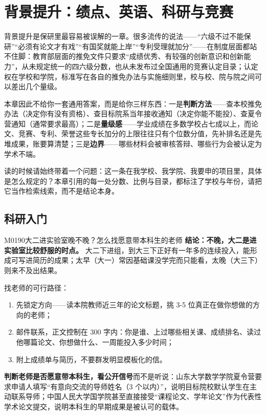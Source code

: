 \chapter{背景提升：绩点、英语、科研与竞赛}
\label{ch04}
\begin{keybox}
背景提升是保研里最容易被误解的一章。很多流传的说法——“六级不过不能保研”“必须有论文才有戏”“有国奖就能上岸”“专利受理就加分”——在制度层面都站不住脚：教育部层面的推免文件只要求“成绩优秀、有较强的创新意识和创新能力”，从未规定统一的四六级分数，也从未发布过全国通用的竞赛认定目录；认定权在学校和学院，标准写在各自的推免办法与实施细则里，校与校、院与院之间可以差出几个量级。

本章因此不给你一套通用答案，而是给你三样东西：一是\textbf{判断方法}——查本校推免办法（决定你有没有资格）、查目标院系当年接收通知（决定你能不能投）、查夏令营通知（通常要求最高）；二是\textbf{量级感}——学业成绩在多数学校占七成以上，而论文、竞赛、专利、荣誉这些专长加分的上限往往只有个位数分值，先补排名还是先堆成果，账要算清楚；三是\textbf{边界}——哪些材料会被审核答辩、哪些行为会被认定为学术不端。

读的时候请始终带着一个问题：这一条在我学校、我学院、我要申的项目里，具体是怎么规定的？本章引用的每一处分数、比例与目录，都标注了学校与年份，请把它当作检索线索，而不是结论本身。
\end{keybox}

\section{科研入门}
\begin{qa}{M0190}{大二进实验室晚不晚？怎么找愿意带本科生的老师}
\textbf{结论：不晚，大二是进实验室比较舒服的时点。} 大二下进组，到大三下正好有一年多的连续投入，能形成可写进简历的成果；太早（大一）常因基础课没学完而只能看，太晚（大三下）则来不及出结果。

找老师的可行路径：
\begin{enumerate}
  \item 先锁定方向——读本院教师近三年的论文标题，挑 3-5 位真正在做你想做的方向的老师；
  \item 邮件联系，正文控制在 300 字内：你是谁、上过哪些相关课、成绩排名、读过他哪篇论文、你想做什么、一周能投入多少时间；
  \item 附上成绩单与简历，不要群发明显模板化的信。
\end{enumerate}

\textbf{判断老师是否愿意带本科生，看公开信号}而不是听说：山东大学数学学院夏令营要求申请人填写“有意向交流的导师姓名（3 个以内）”，说明目标院校默认学生在主动联系导师；中国人民大学国学院甚至直接接受“课程论文、学年论文”作为代表性学术论文提交，说明本科生的早期成果是被认可的载体。
\end{qa}

